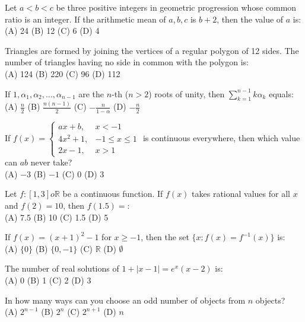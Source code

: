 \documentclass[11pt,a4paper]{article}
\begin{document}
\begin{parts}
  \item Let $a < b < c$ be three positive integers in geometric progression whose common ratio is an integer. If the arithmetic mean of $a, b, c$ is $b + 2$, then the value of $a$ is: \\
  (A) 24 \quad (B) 12 \quad (C) 6 \quad (D) 4

  \item Triangles are formed by joining the vertices of a regular polygon of 12 sides. The number of triangles having no side in common with the polygon is: \\
  (A) 124 \quad (B) 220 \quad (C) 96 \quad (D) 112

  \item If $1, \alpha_1, \alpha_2, \dots, \alpha_{n-1}$ are the $n$-th ($n > 2$) roots of unity, then $\sum_{k=1}^{n-1} k \alpha_k$ equals: \\
  (A) $\frac{n}{2}$ \quad (B) $\frac{n(n-1)}{2}$ \quad (C) $-\frac{n}{1 - \alpha}$ \quad (D) $-\frac{n}{2}$

  \item If $f(x) = 
\begin{cases} ax + b, & x < -1 \\ 4x^2 + 1, & -1 \le x \le 1 \\ 2x - 1, & x > 1 \end{cases}$ is continuous everywhere, then which value can $ab$ never take? \\
  (A) $-3$ \quad (B) $-1$ \quad (C) $0$ \quad (D) $3$

  \item Let $f: [1, 3]  o \mathbb{R}$ be a continuous function. If $f(x)$ takes rational values for all $x$ and $f(2) = 10$, then $f(1.5) =$: \\
  (A) 7.5 \quad (B) 10 \quad (C) 1.5 \quad (D) 5

  \item If $f(x) = (x + 1)^2 - 1$ for $x \ge -1$, then the set $\{x : f(x) = f^{-1}(x)\}$ is: \\
  (A) $\{0\}$ \quad (B) $\{0, -1\}$ \quad (C) $\mathbb{R}$ \quad (D) $\emptyset$

  \item The number of real solutions of $1 + |x - 1| = e^x (x - 2)$ is: \\
  (A) 0 \quad (B) 1 \quad (C) 2 \quad (D) 3

  \item In how many ways can you choose an odd number of objects from $n$ objects? \\
  (A) $2^{n-1}$ \quad (B) $2^n$ \quad (C) $2^{n+1}$ \quad (D) $n$


\end{parts}
\end{document}
